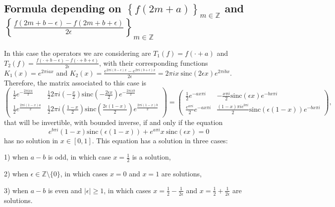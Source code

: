 \documentclass[reqno]{amsart}
\theoremstyle{plain}
\theoremstyle{definition}
\numberwithin{equation}{section}
\newcommand{\Z}{{\mathbb Z}}
\newcommand{\pa}[1]{\left(#1\right)}
\newcommand{\abs}[1]{\left\vert#1\right\vert}
\newcommand{\suc}[1]{\left\{#1\right\}}
\providecommand{\abs}[1]{ \lvert#1  \rvert}
\newcommand{\sinc}{\mathrm{sinc}}
\begin{document}
\subsection{Formula depending on $\suc{f(2m+a)}_{m\in\Z}$ and $\suc{\frac{f(2m+b-\epsilon)-f(2m+b+\epsilon)}{2\epsilon}}_{m\in\Z}$}
In this case the operators we are considering are $T_1(f)=f(\cdot+a)$ and $T_2(f)=\frac{f(\cdot +b-\epsilon)-f(\cdot +b+\epsilon)}{2\epsilon}$, with their corresponding functions $K_1(x)=e^{2\pi i a x}$ and $K_2(x)=\frac{e^{2\pi i (b-\epsilon) x}-e^{2\pi i (b+\epsilon) x}}{2\epsilon}=2\pi i x \ \sinc(2\epsilon x) e^{2\pi i b x}$. Therefore, the matrix associated to this case is
$$
\begin{pmatrix}
    \frac{1}{2} e^{-\frac{2\pi i x a}{2}} & \frac{1}{2}2\pi i \pa{-\frac{x}{2}}\sinc\pa{-\frac{2\epsilon x}{2}} e^{-\frac{2\pi i x b}{2}} \\
    \frac{1}{2} e^\frac{2\pi i (1-x) a}{2} & \frac{1}{2}2\pi i \pa{\frac{1-x}{2}}\sinc\pa{\frac{2\epsilon (1-x)}{2}} e^\frac{2\pi i (1-x) b}{2}
\end{pmatrix}=
\begin{pmatrix}
    \frac{1}{2} e^{-a x \pi i} & -\frac{x \pi i}{2} \sinc(\epsilon x) e^{-b x \pi i} \\
    \frac{e^{a\pi i}}{2} e^{-a x \pi i} & \frac{(1-x) \pi i e^{b\pi i}}{2} \sinc(\epsilon (1-x)) e^{-b x \pi i}
\end{pmatrix},$$
that will be invertible, with bounded inverse, if and only if the equation 
$$e^{b\pi i} (1-x)\sinc(\epsilon (1-x))+e^{a\pi i} x \ \sinc(\epsilon x)=0$$
has no solution in $x\in [0,1]$. This equation has a solution in three cases: 

1) when $a-b$ is odd, in which case $x=\frac{1}{2}$ is a solution, 

2) when $\epsilon\in\Z\setminus\{0\}$, in which cases $x=0$ and $x=1$ are solutions, 

3) when $a-b$ is even and $\abs{\epsilon}\geq 1$, in which cases $x=\frac{1}{2}-\frac{1}{2\epsilon}$ and $x=\frac{1}{2}+\frac{1}{2\epsilon}$ are solutions. 
\end{document}
